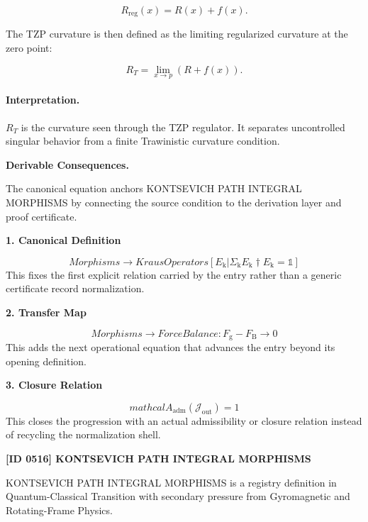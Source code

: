 \begin{equation}
R_{\mathrm{reg}}(x)=R(x)+f(x).
\end{equation}

The TZP curvature is then defined as the limiting regularized curvature at the zero point:

\begin{equation}
\boxed{
R_T
=
\lim_{x\to p}
\left(
R+f(x)
\right).
}
\end{equation}

\paragraph{Interpretation.}
$R_T$ is the curvature seen through the TZP regulator. It separates uncontrolled singular behavior from a finite Trawinistic curvature condition.

\par\vspace{0.35em}
\noindent\textbf{Derivable Consequences.}\quad
\begingroup
\footnotesize
\raggedright
The canonical equation anchors KONTSEVICH PATH INTEGRAL MORPHISMS by connecting the source condition to the derivation layer and proof certificate.
\par\endgroup

\noindent\textbf{1. Canonical Definition}\par
\[
Morphisms \to KrausOperators[{E_{\mathrm{k}} | \Sigma_{\mathrm{k}} E_{\mathrm{k}}\dagger E_{\mathrm{k}} = \mathbb{1}}]
\]
\noindent This fixes the first explicit relation carried by the entry rather than a generic certificate record normalization.\par
\noindent\textbf{2. Transfer Map}\par
\[
Morphisms \to {ForceBalance: F_{\mathrm{g}} - F_{\mathrm{B}} \to 0}
\]
\noindent This adds the next operational equation that advances the entry beyond its opening definition.\par
\noindent\textbf{3. Closure Relation}\par
\[
mathcal{A}_{\mathrm{adm}}\!\left(\mathcal{J}_{\mathrm{out}}\right)=1
\]
\noindent This closes the progression with an actual admissibility or closure relation instead of recycling the normalization shell.\par

\clearpage
\noindent\textbf{[ID 0516] KONTSEVICH PATH INTEGRAL MORPHISMS}\par
\vspace{0.35em}
\begingroup\small
{}
KONTSEVICH PATH INTEGRAL MORPHISMS is a registry definition in Quantum-Classical Transition with secondary pressure from Gyromagnetic and Rotating-Frame Physics.

